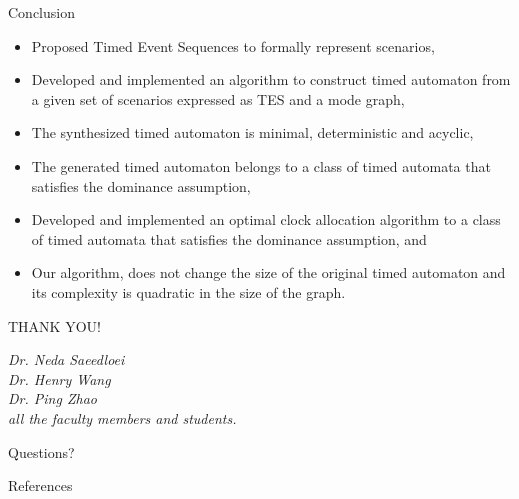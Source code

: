 \documentclass[10pt]{beamer}
\theoremstyle{plain}
\theoremstyle{definition}
\begin{document}
\begin{frame}{Conclusion}
	\begin{itemize}
		\item Proposed Timed Event Sequences to formally represent scenarios,
		\item Developed and implemented an algorithm to construct timed automaton  from a given set of scenarios expressed as TES and a mode graph,
		\item The synthesized timed automaton is minimal, deterministic and acyclic,
		\item The generated timed automaton belongs to a class of timed automata that satisfies the dominance assumption,
		\item Developed and implemented an optimal clock allocation algorithm to a class of timed automata that satisfies the dominance assumption, and
		\item Our algorithm, does not change the size of the original timed automaton and its complexity is quadratic in the size of the graph.
	\end{itemize}
\end{frame}

\begin{frame}[standout]
\Huge THANK YOU! \\
\vspace{0.5cm}
\small

\emph{Dr. Neda Saeedloei}\\
\emph{Dr. Henry Wang}\\
\emph{Dr. Ping Zhao}\\
\emph{all the faculty members and students.}
\end{frame}

\begin{frame}[standout]
	Questions?
\end{frame}


\begin{frame}[allowframebreaks]{References}
	
	
\end{frame}
\end{document}
